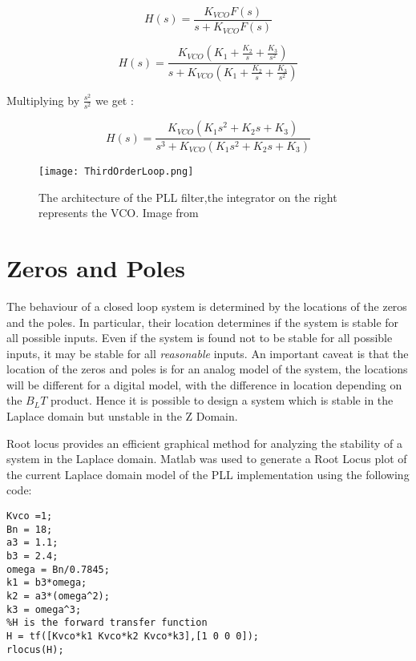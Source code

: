 \begin{equation}
 H(s) = \frac{K_{VCO}F(s)}{s+K_{VCO}F(s)}
\end{equation}

\begin{equation}
 H(s) = \frac{K_{VCO}(K_1 + \frac{K_2}{s} + \frac{K_3}{s^2})}{s+K_{VCO}(K_1 + \frac{K_2}{s} + \frac{K_3}{s^2})}
\end{equation}

Multiplying by $\frac{s^2}{s^2}$ we get :

\begin{equation}
 H(s) = \frac{K_{VCO}(K_1s^2 + K_2s + K_3)}{s^3+K_{VCO}(K_1s^2 + K_2s + K_3)}
 \end{equation}

\begin{figure}[!htb] 
    \centering
    \texttt{[image: ThirdOrderLoop.png]} 
    \caption{The architecture of the PLL filter,the integrator on the right represents the VCO. Image from \cite{Kaplan}}
    \label{fig:ThirdOrderLoop}
\end{figure}

\section{Zeros and Poles}
The behaviour of a closed loop system is determined by the locations of the zeros and the poles. In particular, their location determines if the system is stable for all possible inputs. Even if the system is found not to be stable for all possible inputs, it may be stable for all \emph{reasonable} inputs. An important caveat is that the location of the zeros and poles is for an analog model of the system, the locations will be different for a digital model, with the difference in location depending on the $B_LT$ product.  Hence it is possible to design a system which is stable in the Laplace domain but unstable in the Z Domain. 

Root locus provides an efficient graphical method for analyzing the stability of a system in the Laplace domain\cite{Nise}. Matlab was used to generate a Root Locus plot of the current Laplace domain model of the \ac{PLL} implementation using the following code:

\begin{lstlisting}[frame=single]
Kvco =1;
Bn = 18;
a3 = 1.1;
b3 = 2.4;
omega = Bn/0.7845;
k1 = b3*omega;
k2 = a3*(omega^2);
k3 = omega^3;
%H is the forward transfer function
H = tf([Kvco*k1 Kvco*k2 Kvco*k3],[1 0 0 0]);
rlocus(H);
\end{lstlisting}


